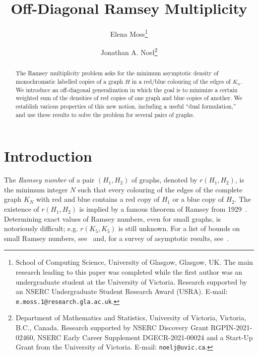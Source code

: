 \documentclass[12pt]{article}
\title{Off-Diagonal Ramsey Multiplicity}
\author{Elena Moss\thanks{School of Computing Science, University of Glasgow, Glasgow, UK. The main research leading to this paper was completed while the first author was an undergraduate student at the University of Victoria. Research supported by an NSERC Undergraduate Student Research Award (USRA). E-mail: \texttt{e.moss.1@research.gla.ac.uk}.} \and Jonathan A. Noel\thanks{Department of Mathematics and Statistics, University of Victoria, Victoria, B.C., Canada. Research supported by NSERC Discovery Grant RGPIN-2021-02460, NSERC Early Career Supplement DGECR-2021-00024 and a Start-Up Grant from the University of Victoria. E-mail: \texttt{noelj@uvic.ca}.}}
\numberwithin{equation}{section}
\theoremstyle{definition}
\theoremstyle{remark}
\begin{document}
\setcounter{MaxMatrixCols}{20}


\maketitle

\begin{abstract}
The Ramsey multiplicity problem asks for the minimum asymptotic density of monochromatic labelled copies of a graph $H$ in a red/blue colouring of the edges of $K_n$. We introduce an off-diagonal generalization in which the goal is to minimize a certain weighted sum of the densities of red copies of one graph and blue copies of another. We establish various properties of this new notion, including a useful ``dual formulation,'' and use these results to solve the problem for several pairs of graphs. 
\end{abstract}

\section{Introduction}

The \emph{Ramsey number} of a pair $(H_1,H_2)$ of graphs, denoted by $r(H_1,H_2)$, is the minimum integer $N$ such that every colouring of the edges of the complete graph $K_N$ with red and blue contains a red copy of $H_1$ or a blue copy of $H_2$. The existence of $r(H_1,H_2)$ is implied by a famous theorem of Ramsey from 1929~\cite{Ramsey29}. Determining exact values of Ramsey numbers, even for small graphs, is notoriously difficult; e.g. $r(K_5,K_5)$ is still unknown. For a list of bounds on small Ramsey numbers, see~\cite{Radziszowski94} and, for a survey of asymptotic results, see~\cite{ConlonFoxSudakov15}. 
\end{document}
